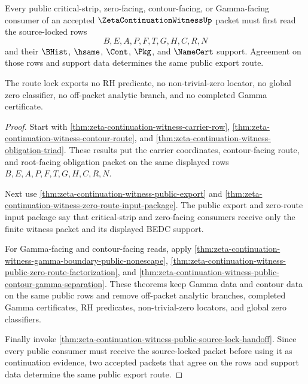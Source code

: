 \begin{theorem}
\label{thm:zeta-continuation-witness-public-export-route-lock}
Every public critical-strip, zero-facing, contour-facing, or Gamma-facing consumer of an accepted $\ZetaContinuationWitnessUp$ packet must first read the source-locked rows
$$
B,E,A,P,F,T,G,H,C,R,N
$$
and their $\BHist$, $\hsame$, $\Cont$, $\Pkg$, and $\NameCert$ support. Agreement on those rows and support data determines the same public export route.

The route lock exports no RH predicate, no non-trivial-zero locator, no global zero classifier, no off-packet analytic branch, and no completed Gamma certificate.
\end{theorem}
\begin{proof}
Start with \autoref{thm:zeta-continuation-witness-carrier-row}, \autoref{thm:zeta-continuation-witness-contour-route}, and \autoref{thm:zeta-continuation-witness-obligation-triad}. These results put the carrier coordinates, contour-facing route, and root-facing obligation packet on the same displayed rows $B,E,A,P,F,T,G,H,C,R,N$.

Next use \autoref{thm:zeta-continuation-witness-public-export} and \autoref{thm:zeta-continuation-witness-zero-route-input-package}. The public export and zero-route input package say that critical-strip and zero-facing consumers receive only the finite witness packet and its displayed BEDC support.

For Gamma-facing and contour-facing reads, apply \autoref{thm:zeta-continuation-witness-gamma-boundary-public-nonescape}, \autoref{thm:zeta-continuation-witness-public-zero-route-factorization}, and \autoref{thm:zeta-continuation-witness-public-contour-gamma-separation}. These theorems keep Gamma data and contour data on the same public rows and remove off-packet analytic branches, completed Gamma certificates, RH predicates, non-trivial-zero locators, and global zero classifiers.

Finally invoke \autoref{thm:zeta-continuation-witness-public-source-lock-handoff}. Since every public consumer must receive the source-locked packet before using it as continuation evidence, two accepted packets that agree on the rows and support data determine the same public export route.
\end{proof}

